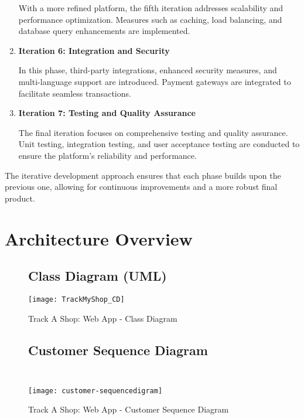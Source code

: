 \begin{enumerate}
	With a more refined platform, the fifth iteration addresses scalability and performance optimization. Measures such as caching, load balancing, and database query enhancements are implemented.
	
	\item \textbf{Iteration 6: Integration and Security}
	
	In this phase, third-party integrations, enhanced security measures, and multi-language support are introduced. Payment gateways are integrated to facilitate seamless transactions.
	
	\item \textbf{Iteration 7: Testing and Quality Assurance}
	
	The final iteration focuses on comprehensive testing and quality assurance. Unit testing, integration testing, and user acceptance testing are conducted to ensure the platform's reliability and performance.
\end{enumerate}

The iterative development approach ensures that each phase builds upon the previous one, allowing for continuous improvements and a more robust final product.


\newpage

\section{Architecture Overview}


\begin{figure}[h]
	\subsection{Class Diagram (UML) }
	\centering
	\texttt{[image: TrackMyShop\_CD]}
	\caption{Track A Shop: Web App - Class Diagram \citep{graphviz2021}}
\end{figure}

\pagebreak
\begin{figure}[h]
	\subsection{Customer Sequence Diagram \\\\}
	\centering
	\texttt{[image: customer-sequencedigram]}
	\caption{Track A Shop: Web App - Customer Sequence Diagram \citep{creately2019}}
\end{figure}

